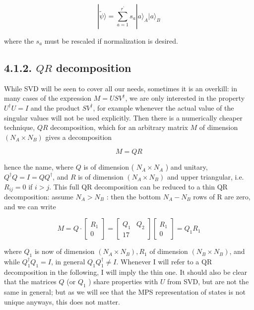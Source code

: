\documentclass[12pt]{article}
\begin{document}
\begin{equation*}
|\tilde{\psi}\rangle=\sum_{a=1}^{r^{\prime}} s_{a}|a\rangle_{A}|a\rangle_{B} \tag{27}
\end{equation*}


where the $s_{a}$ must be rescaled if normalization is desired.

\subsection*{4.1.2. $Q R$ decomposition}
While SVD will be seen to cover all our needs, sometimes it is an overkill: in many cases of the expression $M=U S V^{\dagger}$, we are only interested in the property $U^{\dagger} U=I$ and the product $S V^{\dagger}$, for example whenever the actual value of the singular values will not be used explicitly. Then there is a numerically cheaper technique, $Q R$ decomposition, which for an arbitrary matrix $M$ of dimension $\left(N_{A} \times N_{B}\right)$ gives a decomposition


\begin{equation*}
M=Q R \tag{28}
\end{equation*}


hence the name, where $Q$ is of dimension ( $N_{A} \times N_{A}$ ) and unitary, $Q^{\dagger} Q=I=Q Q^{\dagger}$, and $R$ is of dimension $\left(N_{A} \times N_{B}\right)$ and upper triangular, i.e. $R_{i j}=0$ if $i>j$. This full QR decomposition can be reduced to a thin $\mathrm{QR}$ decomposition: assume $N_{A}>N_{B}$ : then the bottom $N_{A}-N_{B}$ rows of R are zero, and we can write

\[
M=Q \cdot\left[\begin{array}{c}
R_{1}  \tag{29}\\
0
\end{array}\right]=\left[\begin{array}{cc}
Q_{1} & Q_{2} \\
17
\end{array}\right]\left[\begin{array}{c}
R_{1} \\
0
\end{array}\right]=Q_{1} R_{1}
\]

where $Q_{1}$ is now of dimension $\left(N_{A} \times N_{B}\right), R_{1}$ of dimension $\left(N_{B} \times N_{B}\right)$, and while $Q_{1}^{\dagger} Q_{1}=I$, in general $Q_{1} Q_{1}^{\dagger} \neq I$. Whenever I will refer to a $\mathrm{QR}$ decomposition in the following, I will imply the thin one. It should also be clear that the matrices $Q$ (or $Q_{1}$ ) share properties with $U$ from SVD, but are not the same in general; but as we will see that the MPS representation of states is not unique anyways, this does not matter.
\end{document}
